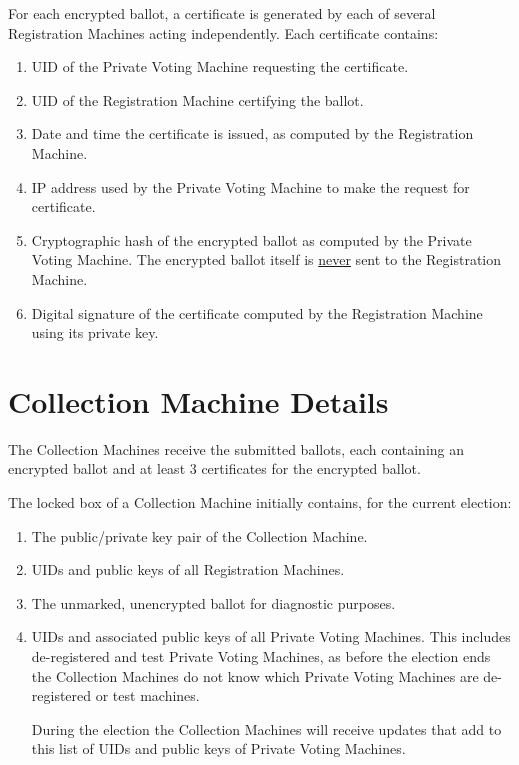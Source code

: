 \documentclass[12pt]{article}
\begin{document}
For each encrypted ballot, a certificate is generated
by each of several Registration Machines acting independently.
Each certificate contains:
\begin{enumerate}
\item UID of the Private Voting Machine requesting the certificate.
\item UID of the Registration Machine certifying the ballot.
\item Date and time the certificate is issued,
as computed by the Registration Machine.
\item IP address used by the Private Voting Machine to make the request
      for certificate.
\item Cryptographic hash of the encrypted ballot as computed by the
      Private Voting Machine.  The encrypted ballot itself is
      \underline{never} sent to the Registration Machine.
\item Digital signature of the certificate computed
by the Registration Machine using its private key.
\end{enumerate}

\section{Collection Machine Details}

The Collection Machines receive the submitted ballots, each containing
an encrypted ballot and at least 3 certificates for the encrypted
ballot.

The locked box of a Collection Machine initially contains, for the
current election:
\begin{enumerate}
\item The public/private key pair of the Collection Machine.
\item UIDs and public keys of all Registration Machines.
\item The unmarked, unencrypted ballot for diagnostic purposes.
\item UIDs and associated public keys of all Private Voting
Machines.  This includes de-registered and test Private Voting
Machines, as before the election ends the
Collection Machines do not know which Private Voting
Machines are de-registered or test machines.

During the election the Collection Machines will receive updates
that add to this list of UIDs and public keys of Private Voting
Machines.
\setcounter{CML-COUNTER}{\value{enumi}}
\end{enumerate}
\end{document}
